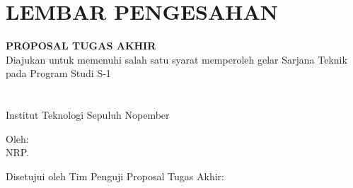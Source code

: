 \chapter*{LEMBAR PENGESAHAN}

\thispagestyle{empty}

\begin{center}
  \textbf{\tatitle{}}
\end{center}

\begingroup
\small

\begin{center}
  \textbf{PROPOSAL TUGAS AKHIR} \\
  Diajukan untuk memenuhi salah satu syarat memperoleh gelar
  Sarjana Teknik pada
  Program Studi S-1 \studyprogram{} \\
  \department{} \\
  \faculty{} \\
  Institut Teknologi Sepuluh Nopember
\end{center}

\begin{center}
  Oleh: \textbf{\name{}} \\
  NRP. \nrp{}
\end{center}

\begin{center}
  Disetujui oleh Tim Penguji Proposal Tugas Akhir:
\end{center}

\vspace{10ex}

\begingroup
\setlength{\tabcolsep}{0pt}

